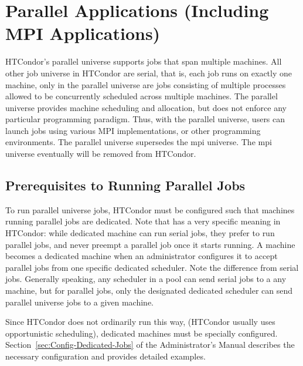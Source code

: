 \section{\label{sec:Parallel}Parallel Applications (Including MPI Applications)}

HTCondor's parallel universe supports jobs that span multiple machines.
All other job universe in HTCondor are serial, that is, each job runs
on exactly one machine, only in the parallel universe are jobs consisting
of multiple processes allowed to be concurrently scheduled across multiple
machines.  The parallel universe provides machine scheduling and allocation,
but does not enforce any particular programming paradigm.  Thus, with
the parallel universe, users can launch jobs using various MPI implementations, 
or other programming environments. The parallel universe supersedes the mpi universe.
The mpi universe eventually will be removed from HTCondor.


\subsection{\label{sec:parallel-setup}Prerequisites to Running Parallel Jobs}

To run parallel universe jobs, HTCondor must be configured such that machines running
parallel jobs are dedicated.  
Note that  has a very specific meaning in HTCondor:
while dedicated machine can run serial jobs, they prefer to run
parallel jobs, and never preempt a parallel job once it starts running.
A machine becomes a dedicated machine when an administrator configures
it to accept parallel jobs from one specific dedicated scheduler.  Note
the difference from serial jobs.  Generally speaking, any scheduler in
a pool can send serial jobs to a any machine, but for parallel jobs,
only the designated dedicated scheduler can send parallel universe
jobs to a given machine.

Since HTCondor does not ordinarily run this way, (HTCondor usually uses
opportunistic scheduling), dedicated machines must be specially
configured.  Section~\ref{sec:Config-Dedicated-Jobs} of the
Administrator's Manual describes the necessary configuration and
provides detailed examples.

